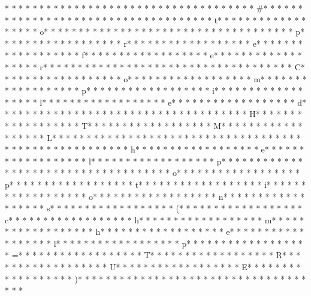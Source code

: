 * * *  * * *  * * *  *  * * *  *  * * *  * 
* * *  * * *  * * *  *  * * *  *  * * *  * #* * *  * * *  * * *  *  * * *  *  * * *  *  * * *  * * *  * * *  *  * * *  *  * * *  * t* * *  * * *  * * *  *  * * *  *  * * *  * o* * *  * * *  * * *  *  * * *  *  * * *  *  * * *  * * *  * * *  *  * * *  *  * * *  * p* * *  * * *  * * *  *  * * *  *  * * *  * r* * *  * * *  * * *  *  * * *  *  * * *  * e* * *  * * *  * * *  *  * * *  *  * * *  * f* * *  * * *  * * *  *  * * *  *  * * *  * e* * *  * * *  * * *  *  * * *  *  * * *  * r* * *  * * *  * * *  *  * * *  *  * * *  *  * * *  * * *  * * *  *  * * *  *  * * *  * C* * *  * * *  * * *  *  * * *  *  * * *  * o* * *  * * *  * * *  *  * * *  *  * * *  * m* * *  * * *  * * *  *  * * *  *  * * *  * p* * *  * * *  * * *  *  * * *  *  * * *  * i* * *  * * *  * * *  *  * * *  *  * * *  * l* * *  * * *  * * *  *  * * *  *  * * *  * e* * *  * * *  * * *  *  * * *  *  * * *  * d* * *  * * *  * * *  *  * * *  *  * * *  *  * * *  * * *  * * *  *  * * *  *  * * *  * H* * *  * * *  * * *  *  * * *  *  * * *  * T* * *  * * *  * * *  *  * * *  *  * * *  * M* * *  * * *  * * *  *  * * *  *  * * *  * L* * *  * * *  * * *  *  * * *  *  * * *  *  * * *  * * *  * * *  *  * * *  *  * * *  * 
* * *  * * *  * * *  *  * * *  *  * * *  * h* * *  * * *  * * *  *  * * *  *  * * *  * e* * *  * * *  * * *  *  * * *  *  * * *  * l* * *  * * *  * * *  *  * * *  *  * * *  * p* * *  * * *  * * *  *  * * *  *  * * *  *  * * *  * * *  * * *  *  * * *  *  * * *  * o* * *  * * *  * * *  *  * * *  *  * * *  * p* * *  * * *  * * *  *  * * *  *  * * *  * t* * *  * * *  * * *  *  * * *  *  * * *  * i* * *  * * *  * * *  *  * * *  *  * * *  * o* * *  * * *  * * *  *  * * *  *  * * *  * n* * *  * * *  * * *  *  * * *  *  * * *  * s* * *  * * *  * * *  *  * * *  *  * * *  * (* * *  * * *  * * *  *  * * *  *  * * *  * c* * *  * * *  * * *  *  * * *  *  * * *  * h* * *  * * *  * * *  *  * * *  *  * * *  * m* * *  * * *  * * *  *  * * *  *  * * *  * h* * *  * * *  * * *  *  * * *  *  * * *  * e* * *  * * *  * * *  *  * * *  *  * * *  * l* * *  * * *  * * *  *  * * *  *  * * *  * p* * *  * * *  * * *  *  * * *  *  * * *  * =* * *  * * *  * * *  *  * * *  *  * * *  * T* * *  * * *  * * *  *  * * *  *  * * *  * R* * *  * * *  * * *  *  * * *  *  * * *  * U* * *  * * *  * * *  *  * * *  *  * * *  * E* * *  * * *  * * *  *  * * *  *  * * *  * )* * *  * * *  * * *  *  * * *  *  * * *  *  * * *  * * *  * * *  *  * * *  *  * * *  * 
